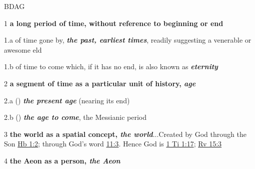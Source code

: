 				\begin{compactdesc}
				
					\item[BDAG ] \phantom{.}
						\begin{compactitem}
							\item[1] \textbf{a long period of time, without reference to beginning or end}
							\item[1.a] of time gone by, \textbf{\textit{the past, earliest times}}, readily suggesting a venerable or awesome eld
							\item[1.b] of time to come which, if it has no end, is also known as \textbf{\textit{eternity}}
							\item[2] \textbf{a segment of time as a particular unit of history, \textit{age}}
							\item[2.a]  () \textbf{\textit{the present age}} (nearing its end)
							\item[2.b]  () \textbf{\textit{the age to come}}, the Messianic period
							\item[3] \textbf{the world as a spatial concept, \textit{the world}}...Created by God through the Son \hyperref[HEBREWS-1-2]{Hb 1:2}; through God's word \hyperref[HEBREWS-11-3]{11:3}. Hence God is  \hyperref[1TIMOTHY-1-17]{1 Ti 1:17}; \hyperref[REVELATIONNT-15-3]{Rv 15:3}
							\item[4] \textbf{the Aeon as a person, \textit{the Aeon}}
						\end{compactitem}
						
						
						
						

\end{compactdesc}

